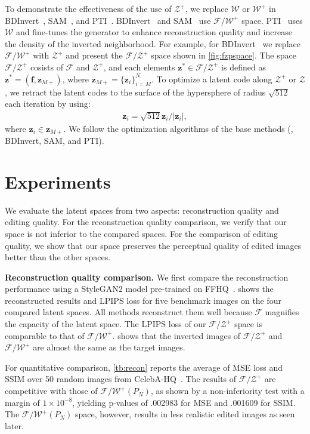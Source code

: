 \documentclass[10pt,twocolumn,letterpaper]{article}
\newcommand{\z}{\bm{z}}
\newcommand{\zmpls}{\bm{z}_{M+}}
\newcommand{\fz}{\bm{z}^{\ast}}
\newcommand{\f}{\bm{f}}
\newcommand{\FWS}{\mathcal{F}/\mathcal{W}^{+}}
\newcommand{\WS}{\mathcal{W}}
\newcommand{\WPS}{\mathcal{W}^{+}}
\newcommand{\ZS}{\mathcal{Z}}
\newcommand{\ZPS}{\mathcal{Z}^{+}}
\newcommand{\FZS}{\mathcal{F}/\mathcal{Z}^{+}}
\newcommand{\FS}{\mathcal{F}}
\begin{document}
To demonstrate the effectiveness of the use of $\ZPS$,
we replace $\WS$ or $\WPS$ in BDInvert~\cite{Kang_2021_ICCV}, SAM~\cite{parmar2022spatially}, and PTI~\cite{roich2021pivotal}.
BDInvert~\cite{Kang_2021_ICCV} and SAM~\cite{parmar2022spatially} use $\FWS$ space.
PTI~\cite{roich2021pivotal} uses $\WS$ and fine-tunes the generator to enhance reconstruction quality and increase the density of the inverted neighborhood.
For example, for BDInvert~\cite{Kang_2021_ICCV} we replace $\FWS$ with $\ZPS$ and present the $\FZS$ space shown in \cref{fig:fzpspace}.
The space $\FZS$ cosists of $\FS$ and $\ZPS$, and each elements $\fz \in \FZS$ is defined as $\fz = (\f, \zmpls)$, where $\zmpls = \{\z_i\}_{i=M}^{N}$.
To optimize a latent code along $\ZPS$ or $\ZS$,
we retract the latent codes to the surface of the hypersphere of radius $\sqrt{512}$ each iteration by using:
\begin{align}
  \z_i = \sqrt{512}\z_i/|\z_i|,
\end{align}
where $\z_i \in \zmpls$. We follow the optimization algorithms of the base methods (\ie, BDInvert, SAM, and PTI).


\section{Experiments}
We evaluate the latent spaces from two aspects: reconstruction quality and editing quality.
For the reconstruction quality comparison, we verify that our space is not inferior to the compared spaces.
For the comparison of editing quality, we show that our space preserves the perceptual quality of edited images better than the other spaces.


\noindent \textbf{Reconstruction quality comparison.}
We first compare the reconstruction performance 
using a StyleGAN2 model pre-trained on FFHQ~\cite{Karras2019style}. 
 shows the reconstructed results and LPIPS loss for five benchmark images on the four compared latent spaces. 
All methods reconstruct them well because $\FS$ magnifies the capacity of the latent space.
The LPIPS loss of our $\FZS$ space is comparable to that of $\FWS$.
 shows that the inverted images of $\FZS$ and $\FWS$ are almost the same as the target images.

For quantitative comparison,
\cref{tb:recon} reports the average of MSE loss and SSIM over 50 random images from CelebA-HQ~\cite{karras2018progressive}.
The results of $\FZS$ are competitive with those of $\FWS(P_N)$, as shown by a non-inferiority test with a margin of $1\times10^{-8}$, yielding p-values of .002983 for MSE and .001609 for SSIM.
The $\FWS(P_N)$ space, however, results in less realistic edited images as seen later.
\end{document}
